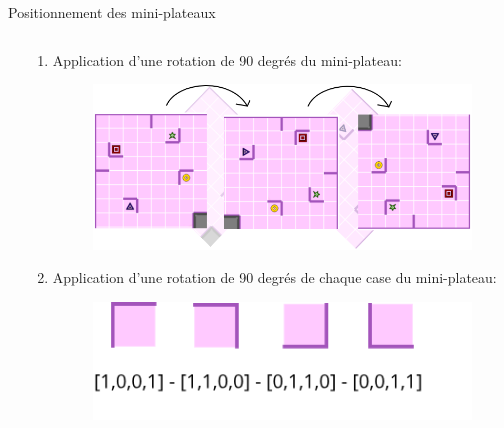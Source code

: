 \documentclass{beamer}
\begin{document}
\begin{frame}{Positionnement des mini-plateaux}
\begin{columns}
\begin{column}{6cm}
                        
                        
                
                    \end{column}
                    \begin{column}{6cm}
                        \begin{enumerate}
                            \item Application d'une rotation de 90 degrés du mini-plateau:
                            
                            \begin{figure}
                                \centering
                                \includegraphics[scale=0.2]{images/rotation.png}
                            \end{figure}
                            
                            \item  Application d'une rotation de 90 degrés de chaque case du mini-plateau:
                              
                             \begin{figure}
                                \centering
                                \includegraphics[scale=0.4]{images/rotaCase.png}
                            \end{figure}
                            
                        \end{enumerate}
                    \end{column}
                \end{columns}
                
               
             
            
            \end{frame}
\end{document}
